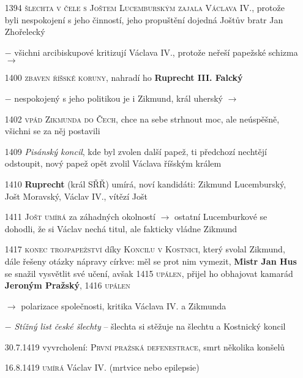 \documentclass{article}
\begin{document}
\begin{itemize}
    \item[1394] \textsc{šlechta v čele s Joštem Lucemburským zajala Václava IV.}, protože byli nespokojení s jeho činností, jeho propuštění dojedná Joštův bratr Jan Zhořelecký
    \item[$-$] všichni arcibiskupové kritizují Václava IV., protože neřeší papežské schizma $\rightarrow$
    \item[1400] \textsc{zbaven říšské koruny}, nahradí ho \textbf{Ruprecht III. Falcký}
    \item[$-$] nespokojený s jeho politikou je i Zikmund, král uherský $\rightarrow$
    \item[1402] \textsc{vpád Zikmunda do Čech}, chce na sebe strhnout moc, ale neúspěšně, všichni se za něj postavili
    \item[1409] \textit{Pisánský koncil}, kde byl zvolen další papež, ti předchozí nechtějí odstoupit, nový papež opět zvolil Václava říšským králem
    \item[1410] \textbf{Ruprecht} (král SŘŘ) umírá, noví kandidáti: Zikmund Lucemburský, Jošt Moravský, Václav IV., vítězí Jošt
    \item[1411] \textsc{Jošt umírá} za záhadných okolností $\rightarrow$ ostatní Lucemburkové se dohodli, že si Václav nechá titul, ale fakticky vládne Zikmund
    \item[1417] \textsc{konec trojpapežství} díky \textsc{Koncilu v Kostnici}, který svolal Zikmund, dále řešeny otázky nápravy církve: měl se prot nim vymezit, \textbf{Mistr Jan Hus} se snažil vysvětlit své učení, avšak 1415 \textsc{upálen}, přijel ho obhajovat kamarád \textbf{Jeroným Pražský}, 1416 \textsc{upálen}
    \item[$\rightarrow$] polarizace společnosti, kritika Václava IV. a Zikmunda
    \item[$-$] \textit{Stížný list české šlechty} -- šlechta si stěžuje na šlechtu a Kostnický koncil
    \item[30.7.1419] vyvrcholení: \textsc{První pražská defenestrace}, smrt několika konšelů
    \item[16.8.1419] \textsc{umírá} Václav IV. (mrtvice nebo epilepsie)
\end{itemize}
\end{document}
